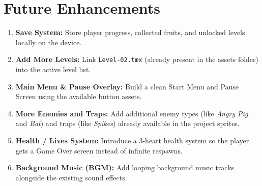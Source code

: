 \documentclass[11pt,a4paper]{article}
\begin{document}
\section{Future Enhancements}

\begin{enumerate}
    \item \textbf{Save System:} Store player progress, collected fruits, and unlocked levels locally on the device.
    \item \textbf{Add More Levels:} Link \texttt{Level-02.tmx} (already present in the assets folder) into the active level list.
    \item \textbf{Main Menu \& Pause Overlay:} Build a clean Start Menu and Pause Screen using the available button assets.
    \item \textbf{More Enemies and Traps:} Add additional enemy types (like \textit{Angry Pig} and \textit{Bat}) and traps (like \textit{Spikes}) already available in the project sprites.
    \item \textbf{Health / Lives System:} Introduce a 3-heart health system so the player gets a Game Over screen instead of infinite respawns.
    \item \textbf{Background Music (BGM):} Add looping background music tracks alongside the existing sound effects.
\end{enumerate}
\end{document}
